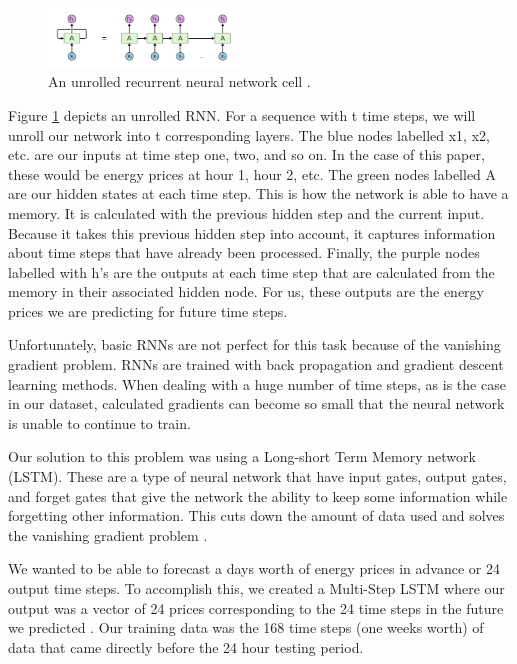 \documentclass[sigconf]{acmart}
\begin{document}
\begin{figure}[h]
\includegraphics[width=0.45\textwidth]{rnn.png}
\caption{An unrolled recurrent neural network cell \cite{Dasgupta2018}.}
\label{fig:rnn}
\end{figure}

Figure \ref{fig:rnn} depicts an unrolled RNN. For a sequence with t time steps, we will unroll our network into t corresponding layers. The blue nodes labelled x1,  x2, etc. are our inputs at time step one, two, and so on. In the case of this paper, these would be energy prices at hour 1, hour 2, etc. The green nodes labelled A are our hidden states at each time step. This is how the network is able to have a memory. It is calculated with the previous hidden step and the current input. Because it takes this previous hidden step into account, it captures information about time steps that have already been processed. Finally, the purple nodes labelled with h’s are the outputs at each time step that are calculated from the memory in their associated hidden node. For us, these outputs are the energy prices we are predicting for future time steps. 

Unfortunately, basic RNNs are not perfect for this task because of the vanishing gradient problem. RNNs are trained with back propagation and gradient descent learning methods. When dealing with a huge number of time steps, as is the case in our dataset, calculated gradients can become so small that the neural network is unable to continue to train. 

Our solution to this problem was using a Long-short Term Memory network (LSTM). These are a type of neural network that have input gates, output gates, and forget gates that give the network the ability to keep some information while forgetting other information. This cuts down the amount of data used and solves the vanishing gradient problem \cite{Dasgupta2018}. 

We wanted to be able to forecast a days worth of energy prices in advance or 24 output time steps. To accomplish this, we created a Multi-Step LSTM where our output was a vector of 24 prices corresponding to the 24 time steps in the future we predicted \cite{Brownlee2018}. Our training data was the 168 time steps (one weeks worth) of data that came directly before the 24 hour testing period.
\end{document}
